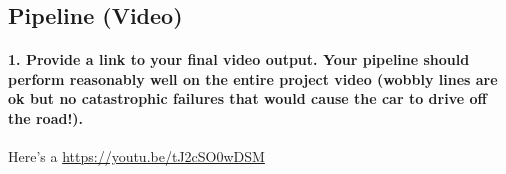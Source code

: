 \documentclass[11pt]{article}
\begin{document}
    \begin{center}
    \end{center}
    { \hspace*{\fill} \\}
    
    \subsection{Pipeline (Video)}\label{pipeline-video}

\paragraph{1. Provide a link to your final video output. Your pipeline
should perform reasonably well on the entire project video (wobbly lines
are ok but no catastrophic failures that would cause the car to drive
off the
road!).}\label{provide-a-link-to-your-final-video-output.-your-pipeline-should-perform-reasonably-well-on-the-entire-project-video-wobbly-lines-are-ok-but-no-catastrophic-failures-that-would-cause-the-car-to-drive-off-the-road.}

Here's a \href{./project_video.mp4}{https://youtu.be/tJ2cSO0wDSM}
\end{document}
